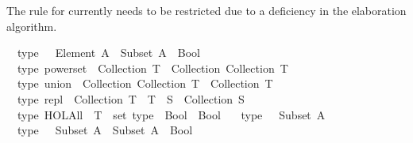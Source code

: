 \begin{isabellebody}
\begin{isamarkuptext}
The rule for  currently needs to be restricted due to a deficiency
in the elaboration algorithm.%
\end{isamarkuptext}\isamarkuptrue%
\isamarkupfalse%
\isanewline
\ \ {\isacharbrackleft}{\kern0pt}type{\isacharbrackright}{\kern0pt}{\isacharcolon}{\kern0pt}\ {\isachardoublequoteopen}{\isacharparenleft}{\kern0pt}{\isasymin}{\isacharparenright}{\kern0pt}\ {\isacharcolon}{\kern0pt}\ {\isacharparenleft}{\kern0pt}Element\ A{\isacharparenright}{\kern0pt}\ {\isasymRightarrow}\ {\isacharparenleft}{\kern0pt}Subset\ A{\isacharparenright}{\kern0pt}\ {\isasymRightarrow}\ Bool{\isachardoublequoteclose}\ \isanewline
\ \ {\isacharbrackleft}{\kern0pt}type{\isacharbrackright}{\kern0pt}{\isacharcolon}{\kern0pt}\ {\isachardoublequoteopen}powerset\ {\isacharcolon}{\kern0pt}\ Collection\ T\ {\isasymRightarrow}\ Collection\ {\isacharparenleft}{\kern0pt}Collection\ T{\isacharparenright}{\kern0pt}{\isachardoublequoteclose}\ \isanewline
\ \ {\isacharbrackleft}{\kern0pt}type{\isacharbrackright}{\kern0pt}{\isacharcolon}{\kern0pt}\ {\isachardoublequoteopen}union\ {\isacharcolon}{\kern0pt}\ Collection\ {\isacharparenleft}{\kern0pt}Collection\ T{\isacharparenright}{\kern0pt}\ {\isasymRightarrow}\ Collection\ T{\isachardoublequoteclose}\ \isanewline
\ \ {\isacharbrackleft}{\kern0pt}type{\isacharbrackright}{\kern0pt}{\isacharcolon}{\kern0pt}\ {\isachardoublequoteopen}repl\ {\isacharcolon}{\kern0pt}\ Collection\ T\ {\isasymRightarrow}\ {\isacharparenleft}{\kern0pt}T\ {\isasymRightarrow}\ S{\isacharparenright}{\kern0pt}\ {\isasymRightarrow}\ Collection\ S{\isachardoublequoteclose}\ \isanewline
\isanewline
\ \ {\isacharbrackleft}{\kern0pt}type{\isacharbrackright}{\kern0pt}{\isacharcolon}{\kern0pt}\ {\isachardoublequoteopen}HOL{\isachardot}{\kern0pt}All\ {\isacharcolon}{\kern0pt}\ {\isacharparenleft}{\kern0pt}{\isacharparenleft}{\kern0pt}T\ {\isacharcolon}{\kern0pt}{\isacharcolon}{\kern0pt}\ set\ type{\isacharparenright}{\kern0pt}\ {\isasymRightarrow}\ Bool{\isacharparenright}{\kern0pt}\ {\isasymRightarrow}\ Bool{\isachardoublequoteclose}\ \isanewline
\ \ {\isacharbrackleft}{\kern0pt}type{\isacharbrackright}{\kern0pt}{\isacharcolon}{\kern0pt}\ {\isachardoublequoteopen}{\isacharbraceleft}{\kern0pt}{\isacharbraceright}{\kern0pt}\ {\isacharcolon}{\kern0pt}\ Subset\ A{\isachardoublequoteclose}\ \isanewline
\ \ {\isacharbrackleft}{\kern0pt}type{\isacharbrackright}{\kern0pt}{\isacharcolon}{\kern0pt}\ {\isachardoublequoteopen}{\isacharparenleft}{\kern0pt}{\isasymsubseteq}{\isacharparenright}{\kern0pt}\ {\isacharcolon}{\kern0pt}\ Subset\ A\ {\isasymRightarrow}\ Subset\ A\ {\isasymRightarrow}\ Bool{\isachardoublequoteclose}\ \isanewline

\end{isabellebody}
